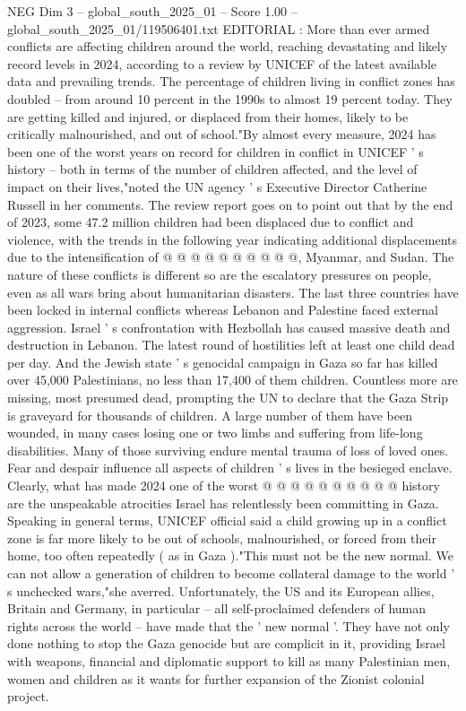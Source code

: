 \begin{textsample}{NEG Dim 3 – global\_south\_2025\_01 – Score 1.00 – global\_south\_2025\_01/119506401.txt}  \label{ex:f3_neg_075}
EDITORIAL : More than ever armed conflicts are affecting children around the world, reaching devastating and likely record levels in 2024, according to a review by UNICEF of the latest available data and prevailing trends.
The percentage of children living in conflict zones has doubled -- from around 10 percent in the 1990s to almost 19 percent today.
They are getting killed and injured, or displaced from their homes, likely to be critically malnourished, and out of school."By almost every measure, 2024 has been one of the worst years on record for children in conflict in UNICEF ' s history -- both in terms of the number of children affected, and the level of impact on their lives,"noted the UN agency ' s Executive Director Catherine Russell in her comments.
The review report goes on to point out that by the end of 2023, some 47.2 million children had been displaced due to conflict and violence, with the trends in the following year indicating additional displacements due to the intensification of @ @ @ @ @ @ @ @ @ @, Myanmar, and Sudan.
The nature of these conflicts is different so are the escalatory pressures on people, even as all wars bring about humanitarian disasters.
The last three countries have been locked in internal conflicts whereas Lebanon and Palestine faced external aggression.
Israel ' s confrontation with Hezbollah has caused massive death and destruction in Lebanon.
The latest round of hostilities left at least one child dead per day.
And the Jewish state ' s genocidal campaign in Gaza so far has killed over 45,000 Palestinians, no less than 17,400 of them children.
Countless more are missing, most presumed dead, prompting the UN to declare that the Gaza Strip is graveyard for thousands of children.
A large number of them have been wounded, in many cases losing one or two limbs and suffering from life-long disabilities.
Many of those surviving endure mental trauma of loss of loved ones.
Fear and despair influence all aspects of children ' s lives in the besieged enclave.
Clearly, what has made 2024 one of the worst @ @ @ @ @ @ @ @ @ @ history are the unspeakable atrocities Israel has relentlessly been committing in Gaza.
Speaking in general terms, UNICEF official said a child growing up in a conflict zone is far more likely to be out of schools, malnourished, or forced from their home, too often repeatedly ( as in Gaza )."This must not be the new normal.
We can not allow a generation of children to become collateral damage to the world ' s unchecked wars,"she averred.
Unfortunately, the US and its European allies, Britain and Germany, in particular -- all self-proclaimed defenders of human rights across the world -- have made that the ' new normal '.
They have not only done nothing to stop the Gaza genocide but are complicit in it, providing Israel with weapons, financial and diplomatic support to kill as many Palestinian men, women and children as it wants for further expansion of the Zionist colonial project.

\end{textsample}
